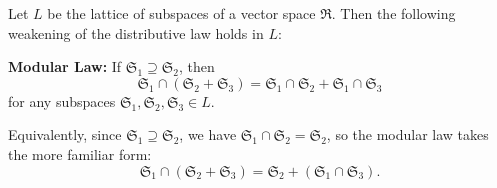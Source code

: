 Let $L$ be the lattice of subspaces of a vector space $\mathfrak{R}$. Then the following weakening of the distributive law holds in $L$:

\textbf{Modular Law:} If $\mathfrak{S}_1 \supseteq \mathfrak{S}_2$, then
$$
\mathfrak{S}_1 \cap (\mathfrak{S}_2 + \mathfrak{S}_3) = \mathfrak{S}_1 \cap \mathfrak{S}_2 + \mathfrak{S}_1 \cap \mathfrak{S}_3
$$
for any subspaces $\mathfrak{S}_1, \mathfrak{S}_2, \mathfrak{S}_3 \in L$.

Equivalently, since $\mathfrak{S}_1 \supseteq \mathfrak{S}_2$, we have $\mathfrak{S}_1 \cap \mathfrak{S}_2 = \mathfrak{S}_2$, so the modular law takes the more familiar form:
$$
\mathfrak{S}_1 \cap (\mathfrak{S}_2 + \mathfrak{S}_3) = \mathfrak{S}_2 + (\mathfrak{S}_1 \cap \mathfrak{S}_3).
$$
